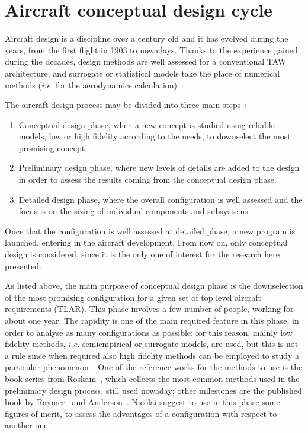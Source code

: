 \section{Aircraft conceptual design cycle}
\label{sec:chap1_ac_design_cycle}

Aircraft design is a discipline over a century old and it has evolved during the years, from the first flight in 1903 to nowadays. 
Thanks to the experience gained during the decades, design methods are well assessed for a conventional \acs{TAW} architecture, and surrogate or statistical models take the place of numerical methods (\textit{i.e.} for the aerodynamics calculation)~\cite{bib:anderson, bib:raymer}.

The aircraft design process may be divided into three main steps~\cite{bib:schmollgruber_phd}: 
\begin{enumerate}
	
	\item Conceptual design phase, when a new concept is studied using reliable models, low or high fidelity according to the needs, to downselect the most promising concept.
	
	\item Preliminary design phase, where new levels of details are added to the design in order to assess the results coming from the conceptual design phase.
	
	\item Detailed design phase, where the overall configuration is well assessed and the focus is on the sizing of individual components and subsystems. 
	
\end{enumerate}
Once that the configuration is well assessed at detailed phase, a new program is launched, entering in the aircraft development. 
From now on, only conceptual design is considered, since it is the only one of interest for the research here presented. 

As listed above, the main purpose of conceptual design phase is the downselection of the most promising configuration for a given set of top level aircraft requirements (TLAR). 
This phase involves a few number of people, working for about one year. 
The rapidity is one of the main required feature in this phase, in order to analyse as many configurations as possible: for this reason, mainly low fidelity methods, \textit{i.e.} semiempirical or surrogate models, are used, but this is not a rule since when required also high fidelity methods can be employed to study a particular phenomenon~\cite{bib:mcdonald_openvsp}.
One of the reference works for the methods to use is the book series from Roskam~\cite{bib:roskam_partI}, which collects the most common methods used in the preliminary design process, still used nowaday; other milestones are the published book by Raymer~\cite{bib:raymer} and Anderson~\cite{bib:anderson}. 
Nicolai suggest to use in this phase some figures of merit, to assess the advantages of a configuration with respect to another one~\cite{bib:nicolai}.

